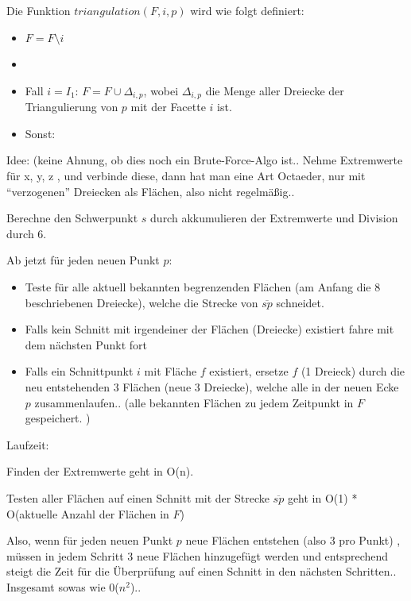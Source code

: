\documentclass[a4paper]{article}
\begin{document}
Die Funktion $triangulation(F,i,p)$ wird wie folgt definiert:

\begin{itemize}
	\item $F = F \setminus i$
	\item 
	\item Fall $i = I_1$: $F = F \cup \Delta_{i,p}$, wobei $\Delta_{i,p}$ die Menge aller Dreiecke der Triangulierung von $p$ mit der Facette $i$ ist.
	\item Sonst: 
\end{itemize}

Idee: (keine Ahnung, ob dies noch ein Brute-Force-Algo ist..
Nehme Extremwerte für x, y, z , und verbinde diese, 
dann hat man eine Art Octaeder, nur mit "`verzogenen"' Dreiecken als Flächen, also nicht regelmäßig..


Berechne den Schwerpunkt $s$ durch akkumulieren der Extremwerte und Division durch 6.

Ab jetzt für jeden neuen Punkt $p$:

\begin{itemize}
	\item Teste für alle aktuell bekannten begrenzenden Flächen (am Anfang die 8
	beschriebenen Dreiecke), welche die Strecke
	von $\overline{sp}$ schneidet. 
	\item Falls kein Schnitt mit irgendeiner der Flächen (Dreiecke) existiert fahre mit dem nächsten Punkt fort
	\item Falls ein Schnittpunkt $i$ mit Fläche $f$ existiert, ersetze $f$ (1 Dreieck) durch
	die neu entstehenden 3 Flächen (neue 3 Dreiecke), welche alle in der neuen Ecke $p$
	zusammenlaufen.. (alle bekannten Flächen zu jedem Zeitpunkt in $F$ gespeichert. )
\end{itemize}

Laufzeit:

Finden der Extremwerte geht in O(n).

Testen aller Flächen auf einen Schnitt mit der Strecke $\overline{sp}$ geht in O(1) *
O(aktuelle Anzahl der Flächen in $F$)

Also, wenn für jeden neuen Punkt $p$ neue Flächen entstehen (also 3 pro Punkt) , 
müssen in jedem Schritt 3 neue Flächen hinzugefügt werden und entsprechend steigt
die Zeit für die Überprüfung auf einen Schnitt in den nächsten Schritten..
Insgesamt sowas wie 0($n^2$)..
\end{document}
